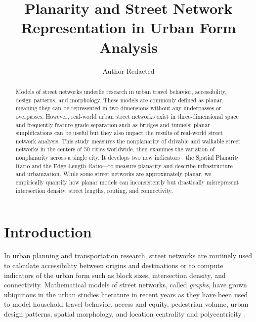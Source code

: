 \documentclass[Afour,sageh,times]{sagej}
\begin{document}
\title{Planarity and Street Network Representation in Urban Form Analysis}
\author{Author Redacted}



\begin{abstract}

Models of street networks underlie research in urban travel behavior, accessibility, design patterns, and morphology. These models are commonly defined as planar, meaning they can be represented in two dimensions without any underpasses or overpasses. However, real-world urban street networks exist in three-dimensional space and frequently feature grade separation such as bridges and tunnels: planar simplifications can be useful but they also impact the results of real-world street network analysis. This study measures the nonplanarity of drivable and walkable street networks in the centers of 50 cities worldwide, then examines the variation of nonplanarity across a single city. It develops two new indicators---the Spatial Planarity Ratio and the Edge Length Ratio---to measure planarity and describe infrastructure and urbanization. While some street networks are approximately planar, we empirically quantify how planar models can inconsistently but drastically misrepresent intersection density, street lengths, routing, and connectivity.

\end{abstract}


\maketitle



\section{Introduction}

In urban planning and transportation research, street networks are routinely used to calculate accessibility between origins and destinations or to compute indicators of the urban form such as block sizes, intersection density, and connectivity. Mathematical models of street networks, called \emph{graphs}, have grown ubiquitous in the urban studies literature in recent years as they have been used to model household travel behavior, access and equity, pedestrian volume, urban design patterns, spatial morphology, and location centrality and polycentricity \citep{marshall_street_2010,pflieger_switzerland_2010,porta_street_2012,lee_identifying_2014,porta_alterations_2014,marshall_community_2014,hajrasouliha_impact_2015,parthasarathi_street_2015,knight_metrics_2015,xiao_identifying_2016,zhong_revealing_2017}.
\end{document}
